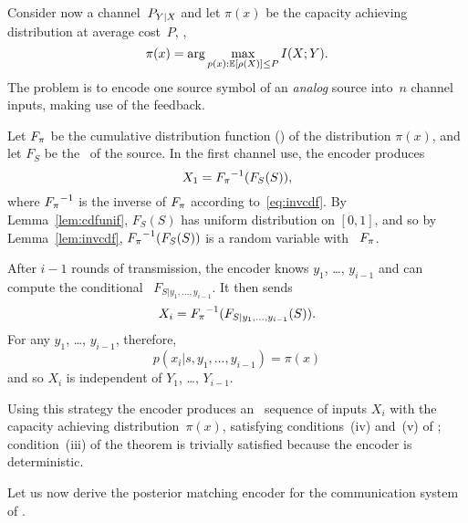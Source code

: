 Consider now a channel~$P_{Y|X}$ and let $\pi(x)$ be the capacity achieving
distribution at average cost~$P$, \ie, 
\begin{equation*}
  \pi(x) = \arg\max_{p(x): \mathbb{E}[\rho(X)] \le P} I(X;Y).
\end{equation*}
The problem is to encode one source symbol of an \emph{analog} source into~$n$
channel inputs, making use of the feedback.

Let ${F_{\pi}}$ be the cumulative distribution function (\cdf) of the distribution
$\pi(x)$, and let $F_S$ be the \cdf\ of the source. In the first channel
use, the encoder produces
\begin{equation}
  \label{eq:posteriorx1}
  X_1 = {F_{\pi}}^{-1}(F_S(S)),
\end{equation}
where ${F_{\pi}}^{-1}$ is the inverse of ${F_{\pi}}$ according to~\eqref{eq:invcdf}. By
Lemma~\ref{lem:cdfunif}, $F_S(S)$ has uniform distribution on $[0,1]$, and so by
Lemma~\ref{lem:invcdf}, ${F_{\pi}}^{-1}(F_S(S))$ is a random variable with \cdf\
${F_{\pi}}$.

After $i-1$ rounds of transmission, the encoder knows $y_1$, \ldots, $y_{i-1}$
and can compute the conditional
\cdf\ $F_{S|y_1, \ldots, y_{i-1}}$. It then sends
\begin{equation}
  \label{eq:posteriorxi}
  X_i = {F_{\pi}}^{-1}(F_{S|y_1,\dots,y_{i-1}}(S)).
\end{equation}
For any $y_1$, \ldots, $y_{i-1}$, therefore,
\begin{equation*}
  p(x_i|s, y_1, \dots, y_{i-1}) = \pi(x)
\end{equation*}
and so $X_i$ is independent of $Y_1$, \ldots, $Y_{i-1}$. 

Using this strategy the encoder produces an \iid\ sequence of inputs $X_i$
with the capacity achieving distribution~$\pi(x)$, satisfying conditions~(iv)
and~(v) of \thmref{tcntcfb}; condition~(iii) of the theorem is
trivially satisfied because the encoder is deterministic.

Let us now derive the posterior matching encoder for the communication system of
\exref{gaussfb}.

